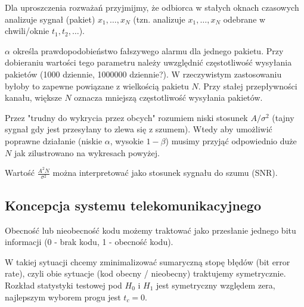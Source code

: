 \documentclass[12pt,a4paper]{article}
\begin{document}
Dla uproszczenia rozważań przyjmijmy, że odbiorca w stałych oknach czasowych analizuje sygnał (pakiet) $x_1, \ldots, x_N$ (tzn. analizuje $x_1, \ldots, x_N$ odebrane w chwili/oknie $t_1, t_2,\ldots$).

$\alpha$ określa prawdopodobieństwo fałszywego alarmu dla jednego pakietu. Przy dobieraniu wartości tego parametru należy uwzględnić częstotliwość wysyłania pakietów (1000 dziennie, 1000000 dziennie?).
W rzeczywistym zastosowaniu byłoby to zapewne powiązane z wielkością pakietu $N$. Przy stałej przepływności kanału, większe $N$ oznacza mniejszą częstotliwość wysyłania pakietów.

Przez "trudny do wykrycia przez obcych" rozumiem niski stosunek $A/\sigma^2$ (tajny sygnał gdy jest przesyłany to zlewa się z szumem).
Wtedy aby umożliwić poprawne działanie (niskie $\alpha$, wysokie $1-\beta$) musimy przyjąć odpowiednio duże $N$ jak zilustrowano na wykresach powyżej.

Wartość $\frac{A^2N}{\sigma^2}$ można interpretować jako stosunek sygnału do szumu (SNR).

\subsection{Koncepcja systemu telekomunikacyjnego}

Obecność lub nieobecność kodu możemy traktować jako przesłanie jednego bitu informacji (0 - brak kodu, 1 - obecność kodu).

W takiej sytuacji chcemy zminimalizować sumaryczną stopę błędów (bit error rate), czyli obie sytuacje (kod obecny / nieobecny) traktujemy symetrycznie.
Rozkład statystyki testowej pod $H_0$ i $H_1$ jest symetryczny względem zera, najlepszym wyborem progu jest $t_c = 0$.
\end{document}
